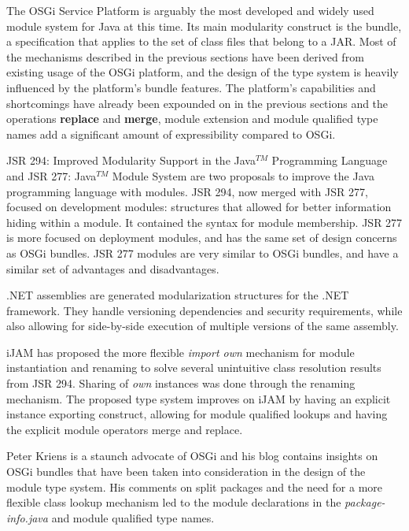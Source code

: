 The OSGi Service Platform \cite{OSGi4} is arguably the most developed and
widely used module system for Java at this time. Its main modularity 
construct is the bundle, a specification that applies to the set of class
files that belong to a JAR. Most of the mechanisms
described in the previous sections have been derived from existing usage
of the OSGi platform, and the design of the type system is heavily
influenced by the platform's bundle features. The platform's
capabilities and shortcomings have already been expounded on in the 
previous sections and the operations \textbf{replace} and \textbf{merge},
module extension and module qualified type names add a significant amount of expressibility compared
to OSGi.

JSR 294: Improved Modularity Support in the Java$^{TM}$ Programming Language \cite{JSR294} and
JSR 277: Java$^{TM}$ Module System \cite{JSR277} are two proposals to improve
the Java programming language with modules. JSR 294, now merged with JSR 277, focused
on development modules: structures that allowed for better information hiding within 
a module. It contained the syntax for module membership.
JSR 277 is more focused on deployment modules, and has the same set of design 
concerns as OSGi bundles. JSR 277 modules are very similar to OSGi bundles,
and have a similar set of advantages and disadvantages.

.NET assemblies \cite{netassemblies} are generated modularization structures
for the .NET framework. They handle versioning dependencies and security
requirements, while also allowing for side-by-side execution of multiple
versions of the same assembly.

iJAM \cite{iJAM} has proposed the more flexible \textit{import own}
mechanism for module instantiation and renaming to solve several unintuitive class
resolution results from JSR 294. Sharing of \textit{own} instances was
done through the renaming mechanism. The proposed type system improves
on iJAM by having an explicit instance exporting construct,
allowing for module qualified lookups and having the explicit module operators
merge and replace.

Peter Kriens is a staunch advocate of OSGi and his blog \cite{iJAMComments, superpackagesNoMore}
contains insights on OSGi bundles that have been taken into consideration
in the design of the module type system. His comments on split packages and
the need for a more flexible class lookup mechanism led to the module declarations
in the \textit{package-info.java} and module qualified type names.

